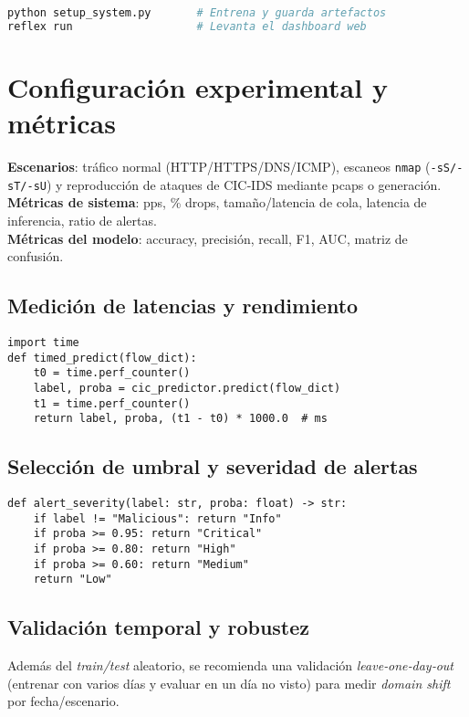 \begin{lstlisting}[caption={Ejecución típica desde terminal},language=bash,label=List.Run]
python setup_system.py       # Entrena y guarda artefactos
reflex run                   # Levanta el dashboard web
\end{lstlisting}

\section{Configuración experimental y métricas}
\textbf{Escenarios}: tráfico normal (HTTP/HTTPS/DNS/ICMP), escaneos \texttt{nmap} (\texttt{-sS/-sT/-sU}) y reproducción de ataques de CIC‑IDS mediante pcaps o generación. \\
\textbf{Métricas de sistema}: pps, \% drops, tamaño/latencia de cola, latencia de inferencia, ratio de alertas. \\
\textbf{Métricas del modelo}: accuracy, precisión, recall, F1, AUC, matriz de confusión.

\subsection*{Medición de latencias y rendimiento}
\begin{lstlisting}[style=tfgpython,caption={Medición rápida de latencia de inferencia},label=List.MetricsLatency]
import time
def timed_predict(flow_dict):
    t0 = time.perf_counter()
    label, proba = cic_predictor.predict(flow_dict)
    t1 = time.perf_counter()
    return label, proba, (t1 - t0) * 1000.0  # ms
\end{lstlisting}

\subsection*{Selección de umbral y severidad de alertas}
\begin{lstlisting}[style=tfgpython,caption={Mapa simple de severidad en función de probabilidad},label=List.AlertSeverity]
def alert_severity(label: str, proba: float) -> str:
    if label != "Malicious": return "Info"
    if proba >= 0.95: return "Critical"
    if proba >= 0.80: return "High"
    if proba >= 0.60: return "Medium"
    return "Low"
\end{lstlisting}

\subsection*{Validación temporal y robustez}
Además del \textit{train/test} aleatorio, se recomienda una validación \emph{leave‑one‑day‑out} (entrenar con varios días y evaluar en un día no visto) para medir \emph{domain shift} por fecha/escenario.


